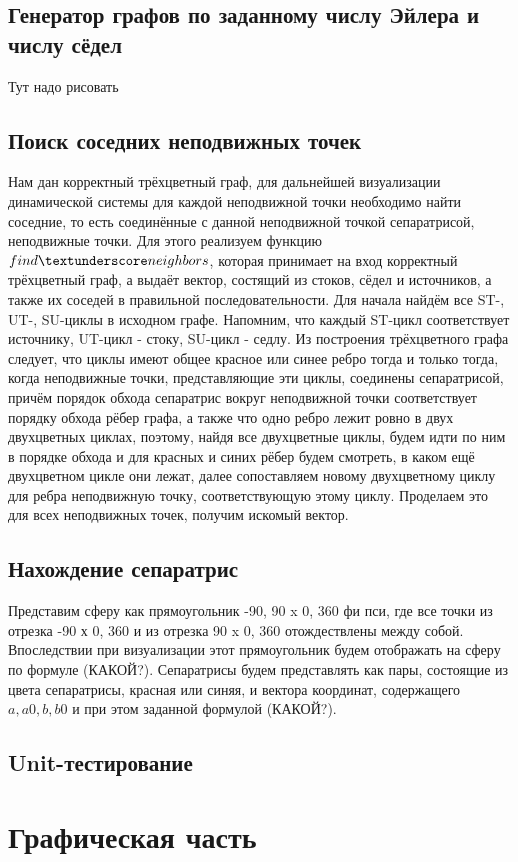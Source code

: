 	\subsection{Генератор графов по заданному числу Эйлера и числу сёдел}
	Тут надо рисовать
	\subsection{Поиск соседних неподвижных точек}
	Нам дан корректный трёхцветный граф, для дальнейшей визуализации динамической системы для каждой неподвижной точки необходимо найти соседние, то есть соединённые с данной неподвижной точкой сепаратрисой, неподвижные точки. Для этого реализуем функцию $find \textunderscore neighbors$, которая принимает на вход корректный трёхцветный граф, а выдаёт вектор, состящий из стоков, сёдел и источников, а также их соседей в правильной последовательности.
	Для начала найдём все ST-, UT-, SU-циклы в исходном графе. Напомним, что каждый ST-цикл соответствует источнику, UT-цикл - стоку, SU-цикл - седлу. Из построения трёхцветного графа следует, что циклы имеют общее красное или синее ребро тогда и только тогда, когда неподвижные точки, представляющие эти циклы, соединены сепаратрисой, причём порядок обхода сепаратрис вокруг неподвижной точки соответствует порядку обхода рёбер графа, а также что одно ребро лежит ровно в двух двухцветных циклах, поэтому, найдя все двухцветные циклы, будем идти по ним в порядке обхода и для красных и синих рёбер будем смотреть, в каком ещё двухцветном цикле они лежат, далее сопоставляем новому двухцветному циклу для ребра неподвижную точку, соответствующую этому циклу. Проделаем это для всех неподвижных точек, получим искомый вектор.
	\subsection{Нахождение сепаратрис}
	Представим сферу как прямоугольник -90, 90 x 0, 360 фи пси, где все точки из отрезка -90 х 0, 360 и из отрезка 90 x 0, 360 отождествлены между собой. Впоследствии при визуализации этот прямоугольник будем отображать на сферу по формуле (КАКОЙ?). Сепаратрисы будем представлять как пары, состоящие из цвета сепаратрисы, красная или синяя, и вектора координат, содержащего $a, a0, b, b0$ и при этом заданной формулой (КАКОЙ?). 
	
	\subsection{Unit-тестирование}
	\section{Графическая часть}
